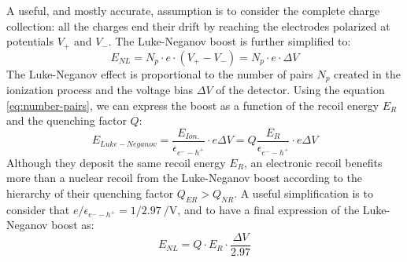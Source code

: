 
A useful, and mostly accurate, assumption is to consider the complete charge collection: all the charges end their drift by reaching the electrodes polarized at potentials $V_+$ and $V_-$. The Luke-Neganov boost is further simplified to:
\begin{equation}
E_{NL} = N_p \cdot e \cdot (V_+ - V_-) = N_p \cdot e \cdot \Delta V
\end{equation}
The Luke-Neganov effect is proportional to the number of pairs $N_p$ created in the ionization process and the voltage bias $\Delta V$ of the detector. Using the equation \ref{eq:number-pairs}, we can express the boost as a function of the recoil energy $E_R$ and the quenching factor $Q$:
\begin{equation}
E_{Luke-Neganov} = \frac{E_{Ion.}}{\epsilon_{e^--h^+}} \cdot e \Delta V = Q \frac{E_R}{\epsilon_{e^--h^+}} \cdot e \Delta V
\end{equation}
Although they deposit the same recoil energy $E_R$, an electronic recoil benefits more than a nuclear recoil from the Luke-Neganov boost according to the hierarchy of their quenching factor $Q_{ER} > Q_{NR}$. 
A useful simplification is to consider that $e / \epsilon_{e^--h^+} = 1/2.97\ \si{\per\volt}$,  and to have a final expression of the Luke-Neganov boost as:
\begin{equation}
\label{eq:nl-boost}
E_{NL} = Q \cdot E_R \cdot \frac{\Delta V}{2.97}
\end{equation}

